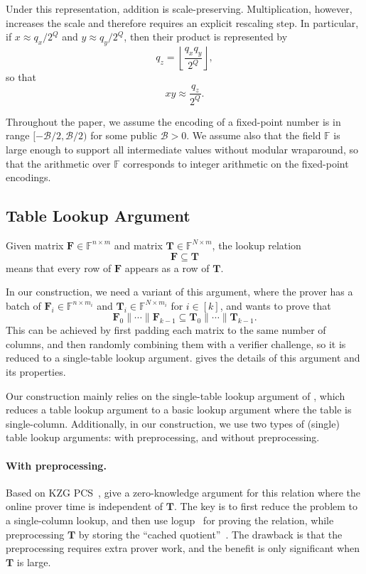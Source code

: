 Under this representation, addition is scale-preserving.
Multiplication, however, increases the scale and therefore requires an explicit
rescaling step. In particular, if
$x \approx q_x/2^Q$ and $y \approx q_y/2^Q$, then their product is represented by
\[
q_z = \left\lfloor \frac{q_x q_y}{2^Q} \right\rfloor,
\]
so that
\[
xy \approx \frac{q_z}{2^Q}.
\]

Throughout the paper, we assume the encoding of a fixed-point number
    is in range $[-\mathcal{B}/2, \mathcal{B}/2)$ for some public $\mathcal{B}>0$.
    We assume also that the field $\mathbb{F}$ is large enough to support all intermediate values without modular wraparound, so that the arithmetic over $\mathbb{F}$ corresponds to integer arithmetic on the fixed-point encodings.

\subsection{Table Lookup Argument}\label{subsec:prelim-lookup}
Given matrix $\mathbf{F}\in \mathbb{F}^{n\times m}$
    and matrix $\mathbf{T}\in \mathbb{F}^{N\times m}$,
    the lookup relation
    \[\mathbf{F}\subseteq \mathbf{T}\]
    means that every row of $\mathbf{F}$ appears as a row of $\mathbf{T}$.


In our construction, we need a variant of this argument,
    where the prover has a batch of $\mathbf{F}_i\in \mathbb{F}^{n\times m_i}$
    and $\mathbf{T}_i \in \mathbb{F}^{N\times m_i}$
    for $i\in [k]$,
    and wants to prove that
    \[\mathbf{F}_0\| \cdots \| \mathbf{F}_{k-1} \subseteq \mathbf{T}_0\| \cdots \| \mathbf{T}_{k-1}.\]
    This can be achieved by first padding each matrix to the same
    number of columns,
    and then randomly combining them with a verifier challenge,
    so it is reduced to a single-table lookup argument.
     gives the details of this argument and its properties.

Our construction mainly relies on the single-table lookup argument of \citet{cq++24},
    which reduces a table lookup argument to a basic lookup argument
    where the table is single-column.
    Additionally, in our construction, we use
    two types of (single) table lookup arguments:
    with preprocessing, and without preprocessing.
    
\paragraph{With preprocessing.}
Based on KZG PCS~\cite{kzg10}, \citet{cq++24} give a zero-knowledge argument for this relation
    where the online prover time is independent of $\mathbf{T}$.
    The key is to first reduce the problem to a single-column lookup, and then
    use logup~\cite{logup22} for proving the relation,
    while preprocessing $\mathbf{T}$ by storing the ``cached quotient''~\cite{cq22}.
    The drawback is that the preprocessing requires extra prover work,
    and the benefit is only significant when $\mathbf{T}$ is large.

